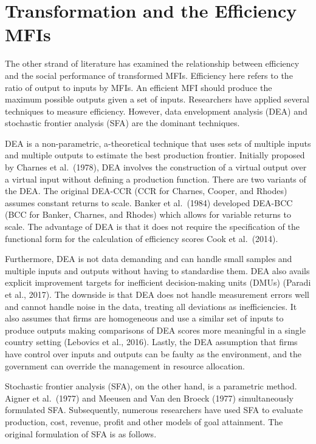 \documentclass[a4paper, nobind]{templates/ociamthesis}
\begin{document}
\hypertarget{transformation-and-the-efficiency-mfis}{%
\section{Transformation and the Efficiency MFIs}\label{transformation-and-the-efficiency-mfis}}

\noindent The other strand of literature has examined the relationship between efficiency and the social performance of transformed MFIs. Efficiency here refers to the ratio of output to inputs by MFIs. An efficient MFI should produce the maximum possible outputs given a set of inputs. Researchers have applied several techniques to measure efficiency. However, data envelopment analysis (DEA) and stochastic frontier analysis (SFA) are the dominant techniques.

DEA is a non-parametric, a-theoretical technique that uses sets of multiple inputs and multiple outputs to estimate the best production frontier. Initially proposed by Charnes et al.~(1978), DEA involves the construction of a virtual output over a virtual input without defining a production function. There are two variants of the DEA. The original DEA-CCR (CCR for Charnes, Cooper, and Rhodes) assumes constant returns to scale. Banker et al.~(1984) developed DEA-BCC (BCC for Banker, Charnes, and Rhodes) which allows for variable returns to scale. The advantage of DEA is that it does not require the specification of the functional form for the calculation of efficiency scores Cook et al.~(2014).

Furthermore, DEA is not data demanding and can handle small samples and multiple inputs and outputs without having to standardise them. DEA also avails explicit improvement targets for inefficient decision-making units (DMUs) (Paradi et al., 2017). The downside is that DEA does not handle measurement errors well and cannot handle noise in the data, treating all deviations as inefficiencies. It also assumes that firms are homogeneous and use a similar set of inputs to produce outputs making comparisons of DEA scores more meaningful in a single country setting (Lebovics et al., 2016). Lastly, the DEA assumption that firms have control over inputs and outputs can be faulty as the environment, and the government can override the management in resource allocation.

Stochastic frontier analysis (SFA), on the other hand, is a parametric method. Aigner et al.~(1977) and Meeusen and Van den Broeck (1977) simultaneously formulated SFA. Subsequently, numerous researchers have used SFA to evaluate production, cost, revenue, profit and other models of goal attainment. The original formulation of SFA is as follows.
\end{document}
